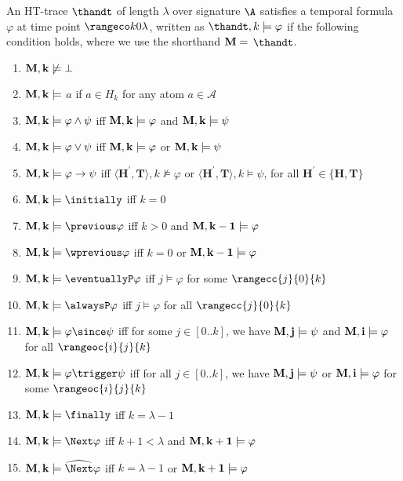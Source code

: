 \begin{definition}
  An HT-trace $\thandt$ of length $\lambda$ over signature $\A$
  satisfies a temporal formula $\varphi$ at time point
  $\kinlambda$, written as $\thandt,k \models \varphi$ if
  the following condition holds, where we use the shorthand
  $\bf{M} =$ $\thandt$.
\begin{enumerate}
  \item $\bf{M}, k \not \models \bot$
  \item $\bf{M},k \models$ $a$ if $a \in H_{k}$ for any atom $a \in \mathcal{A}$
  \item $\bf{M},k \models \varphi \wedge \psi$ iff $\bf{M}, k \models \varphi$ and $\bf{M}, k \models \psi$
  \item $\bf{M},k \models \varphi \vee \psi$ iff $\bf{M}, k \models \varphi$ or $\bf{M}, k \models \psi$
  \item $\bf{M},k \models \varphi \rightarrow \psi$ iff 
    $\langle \bm{H}^{\prime},\bm{T} \rangle, k \not \models \varphi$ 
    or $\langle \bm{H}^{\prime},\bm{T} \rangle, k \models \psi$, 
    for all $\bm{H}^{\prime} \in\{\bm{H}, \bm{T}\}$
  \item $\bf{M},k \models \initially$ iff $k=0$
  \item $\bf{M},k \models \previous \varphi$ iff $k>0$ and $\bf{M},k-1 \models \varphi$
  \item $\bf{M},k \models \wprevious \varphi$ iff $k=0$ or $\bf{M},k-1 \models \varphi$
  \item $\bf{M},k \models \eventuallyP \varphi$ iff $j \models \varphi$ for some $\rangecc{j}{0}{k}$  
  \item $\bf{M},k \models \alwaysP \varphi$ iff $j \models \varphi$ for all $\rangecc{j}{0}{k}$  
  \item $\bf{M},k \models \varphi \since \psi$ iff for some $j \in[0 . . k]$, we have $\bf{M}, j \models \psi$ and $\bf{M},i \models \varphi$ for all $\rangeoc{i}{j}{k}$
  \item $\bf{M},k \models \varphi \trigger \psi$ iff for all $j \in[0 . . k]$, we have $\bf{M}, j \models \psi$ or $\bf{M}, i \models \varphi$ for some $\rangeoc{i}{j}{k}$
  \item $\bf{M},k \models \finally$ iff $k=\lambda - 1$
  \item $\bf{M},k \models \Next \varphi$ iff $k+1<\lambda$ and $\bf{M}, k+1 \models \varphi$
  \item $\bf{M},k \models \wnext \varphi$ iff $k=\lambda-1$ or $\bf{M},k+1 \models \varphi$

\end{enumerate}
\end{definition}
